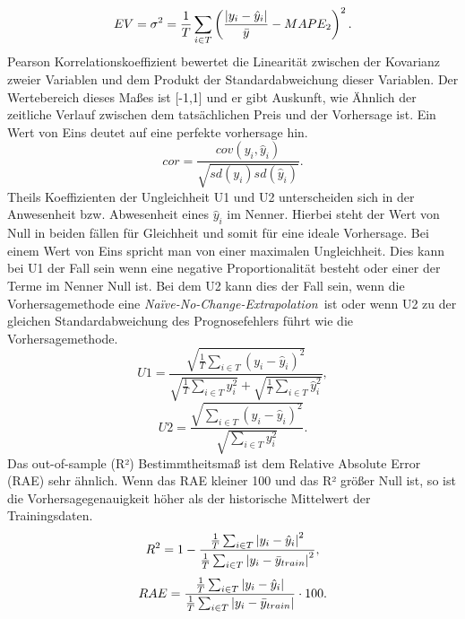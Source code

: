 \begin{equation}
EV= \sigma^2 = \frac{1}{T} \sum\limits_{i \in T} \left ( \frac{\abs{y_i-\hat{y}_i}}{\bar{y}} - MAPE_2  \right ) ^2.
\label{gl:EV}
\end{equation}
%
Pearson Korrelationskoeffizient bewertet die Linearität zwischen der Kovarianz zweier Variablen und dem Produkt der Standardabweichung dieser Variablen. Der Wertebereich dieses Maßes ist [-1,1] und er gibt Auskunft, wie Ähnlich der zeitliche Verlauf zwischen dem tatsächlichen Preis und der Vorhersage ist. Ein Wert von Eins deutet auf eine perfekte vorhersage hin.\, 
\begin{equation}
cor = \frac{cov(y_i,\hat{y}_i)}{\sqrt{sd(y_i)sd(\hat{y}_i)}} .
\label{gl:cor}
\end{equation}
%
%
Theils Koeffizienten der Ungleichheit U1 und U2 unterscheiden sich in der Anwesenheit bzw. Abwesenheit eines $\hat{y}_i$ im Nenner. Hierbei steht der Wert von Null in beiden fällen für Gleichheit und somit für eine ideale Vorhersage. Bei einem Wert von Eins spricht man von einer maximalen Ungleichheit. Dies kann bei U1 der Fall sein wenn eine negative Proportionalität besteht oder einer der Terme im Nenner Null ist. Bei dem U2 kann dies der Fall sein, wenn die Vorhersagemethode eine \textit{Na\"{i}ve-No-Change-Extrapolation}\, ist oder wenn U2 zu der gleichen Standardabweichung des Prognosefehlers führt wie die Vorhersagemethode.\,
\begin{equation}
U1 = \frac{\sqrt{\frac{1}{T} \sum_{i \in T} (y_i-\hat{y}_i)^2}}{ \sqrt{\frac{1}{T} \sum_{i \in T} y_i^2} + \sqrt{\frac{1}{T} \sum_{i \in T} \hat{y}_i^2}},
\label{gl:U1}
\end{equation}
%
\begin{equation}
U2 = \frac{\sqrt{\sum_{i \in T} (y_i-\hat{y}_i)^2}}{ \sqrt{ \sum_{i \in T} y_i^2} }.
\label{gl:U2}
\end{equation}
%
%
Das out-of-sample (R²) Bestimmtheitsmaß ist dem Relative Absolute Error (RAE) sehr ähnlich. Wenn das RAE kleiner 100 und das R² größer Null ist, so ist die Vorhersagegenauigkeit höher als der historische Mittelwert der Trainingsdaten.
\begin{equation}
R^2 = 1 -  \frac{\frac{1}{T} \sum_{i \in T} \abs{y_i-\hat{y}_i}^2}{ \frac{1}{T} \sum_{i \in T} \abs{y_i-\bar{y}_{train}}^2 } ,
\label{gl:R2}
\end{equation}
%
%
\begin{equation}
RAE = \frac{\frac{1}{T} \sum_{i \in T} \abs{y_i-\hat{y}_i}}{ \frac{1}{T} \sum_{i \in T} \abs{y_i-\bar{y}_{train}} } \cdot 100 .
\label{gl:RAE}
\end{equation}
